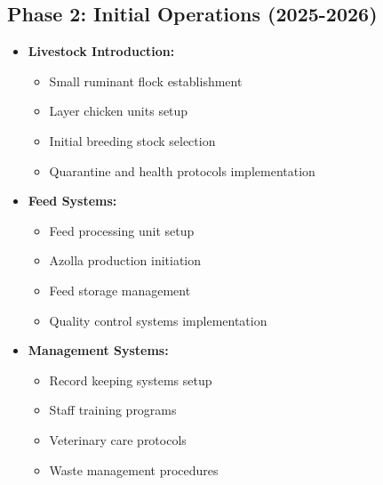 \subsection{Phase 2: Initial Operations (2025-2026)}
\begin{itemize}
    \item \textbf{Livestock Introduction:}
    \begin{itemize}
        \item Small ruminant flock establishment
        \item Layer chicken units setup
        \item Initial breeding stock selection
        \item Quarantine and health protocols implementation
    \end{itemize}
    
    \item \textbf{Feed Systems:}
    \begin{itemize}
        \item Feed processing unit setup
        \item Azolla production initiation
        \item Feed storage management
        \item Quality control systems implementation
    \end{itemize}
    
    \item \textbf{Management Systems:}
    \begin{itemize}
        \item Record keeping systems setup
        \item Staff training programs
        \item Veterinary care protocols
        \item Waste management procedures
    \end{itemize}
\end{itemize}

